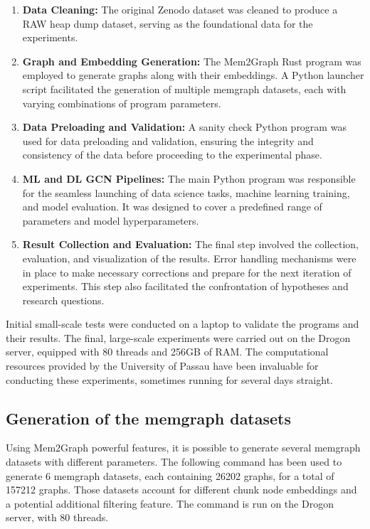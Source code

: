 \begin{enumerate}
    \item \textbf{Data Cleaning:} The original Zenodo dataset was cleaned to produce a RAW heap dump dataset, serving as the foundational data for the experiments.
    
    \item \textbf{Graph and Embedding Generation:} The Mem2Graph Rust program was employed to generate graphs along with their embeddings. A Python launcher script facilitated the generation of multiple memgraph datasets, each with varying combinations of program parameters.
    
    \item \textbf{Data Preloading and Validation:} A sanity check Python program was used for data preloading and validation, ensuring the integrity and consistency of the data before proceeding to the experimental phase.
    
    \item \textbf{ML and DL GCN Pipelines:} The main Python program was responsible for the seamless launching of data science tasks, machine learning training, and model evaluation. It was designed to cover a predefined range of parameters and model hyperparameters.
    
    \item \textbf{Result Collection and Evaluation:} The final step involved the collection, evaluation, and visualization of the results. Error handling mechanisms were in place to make necessary corrections and prepare for the next iteration of experiments. This step also facilitated the confrontation of hypotheses and research questions.
\end{enumerate}

Initial small-scale tests were conducted on a laptop to validate the programs and their results. The final, large-scale experiments were carried out on the Drogon server, equipped with 80 threads and 256GB of RAM. The computational resources provided by the University of Passau have been invaluable for conducting these experiments, sometimes running for several days straight.

\subsection{Generation of the memgraph datasets}
Using Mem2Graph powerful features, it is possible to generate several memgraph datasets with different parameters. The following command has been used to generate 6 memgraph datasets, each containing 26202 graphs, for a total of 157212 graphs. Those datasets account for different chunk node embeddings and a potential additional filtering feature. The command is run on the Drogon server, with 80 threads.

